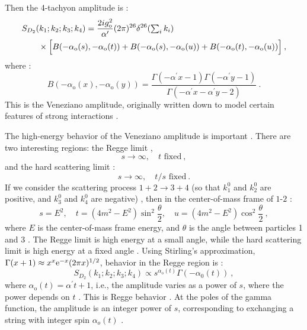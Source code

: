 Then the 4-tachyon amplitude is :
\begin{align}
	&S_{D_{2}}(k_{1}; k_{2} ; k_{3} ; k_{4})=\frac{2 i g_{\mathrm{o}}^{2}}{\alpha^{\prime}}
	(2 \pi)^{26} \delta^{26}({\textstyle \sum_{i} k_{i}}) \nonumber \\
	&\qquad \times\Bigl[B(-\alpha_{\mathrm{o}}(s),-\alpha_{\mathrm{o}}(t))+B(-\alpha_{\mathrm{o}}(s),-\alpha_{\mathrm{o}}(u))
	+B(-\alpha_{\mathrm{o}}(t),-\alpha_{\mathrm{o}}(u))\Bigr] \:, \label{6.4.23}
\end{align}
where :
\begin{equation}
	B(-\alpha_{\mathrm{o}}(x),-\alpha_{\mathrm{o}}(y))=
	\frac{\Gamma(-\alpha^{\prime} x-1) \Gamma(-\alpha^{\prime} y-1)}{\Gamma(-\alpha^{\prime} x-\alpha^{\prime} y-2)} \:. \label{6.4.24}
\end{equation}
This is the Veneziano amplitude, originally written down to model certain features of strong interactions .

The high-energy behavior of the Veneziano amplitude is important . There are two interesting regions: the Regge limit ,
\begin{equation}
	s \rightarrow \infty, \quad t \text{ fixed} \:, \label{6.4.25}
\end{equation}
and the hard scattering limit :
\begin{equation}
	s \rightarrow \infty, \quad t / s \text{ fixed} \:. \label{6.4.26}
\end{equation}
If we consider the scattering process $1+2 \rightarrow 3+4$ (so that $k_{1}^{0}$ and $k_{2}^{0}$ are positive, and $k_{3}^{0}$ and $k_{4}^{0}$ are negative)  , then in the center-of-mass frame of $1$-$2$ :
\begin{equation}
	s=E^{2}, \quad t=(4 m^{2}-E^{2}) \sin^{2}\frac{\theta}{2}, \quad u=(4 m^{2}-E^{2}) \cos ^{2} \frac{\theta}{2} \:, \label{6.4.27}
\end{equation}
where $E$ is the center-of-mass frame energy, and $\theta$ is the angle between particles 1 and 3 . The Regge limit is high energy at a small angle, while the hard scattering limit is high energy at a fixed angle . Using Stirling's approximation, $\Gamma(x+1) \approx x^{x} \mathrm{e}^{-x}(2 \pi x)^{1 / 2}$, behavior in the Regge region is :
\begin{equation}
	S_{D_{2}}(k_{1} ; k_{2} ; k_{3} ; k_{4}) \propto s^{\alpha_{\mathrm{o}}(t)} \Gamma(-\alpha_{0}(t)) \:, \label{6.4.28}
\end{equation}
where $\alpha_{\mathrm{o}}(t)=\alpha^{\prime} t+1$, i.e., the amplitude varies as a power of $s$, where the power depends on $t$ . This is Regge behavior . At the poles of the gamma function, the amplitude is an integer power of $s$, corresponding to exchanging a string with integer spin $\alpha_o(t)$ .

